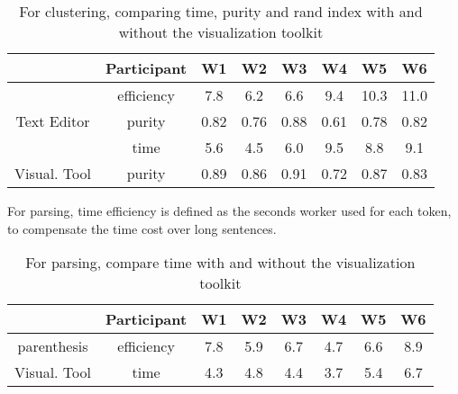 \begin{table*}[bt]
\begin{center}
\begin{tabular}{|c|c|c|c|c|c|c|c|}
 \hline
 & Participant & W1 & W2 & W3 & W4 & W5 & W6 \\\hline
 & efficiency & 7.8 & 6.2 & 6.6 & 9.4 & 10.3 & 11.0\\
Text Editor& purity & 0.82 & 0.76 & 0.88 & 0.61  & 0.78 & 0.82\\\hline
& time & 5.6 & 4.5 & 6.0 & 9.5 & 8.8 & 9.1\\
Visual. Tool& purity & 0.89 & 0.86 & 0.91 & 0.72 & 0.87 & 0.83\\\hline
\end{tabular}
\end{center}
\caption{For clustering, comparing time, purity and rand index with and without the visualization toolkit} \label{t:cluster}
\end{table*}

For parsing, time efficiency is defined as the seconds worker used for each token, to compensate the time cost over long sentences.
\begin{table*}[bt]
\begin{center}
\begin{tabular}{|c|c|c|c|c|c|c|c|}
 \hline
 & Participant & W1 & W2 & W3 & W4 & W5 & W6 \\\hline
parenthesis & efficiency & 7.8 & 5.9  & 6.7 & 4.7 & 6.6 & 8.9\\\hline
Visual. Tool& time & 4.3 & 4.8 & 4.4& 3.7 & 5.4 & 6.7\\\hline
\end{tabular}
\end{center}
\caption{For parsing, compare time with and without the visualization toolkit} \label{t:cluster}
\end{table*}

